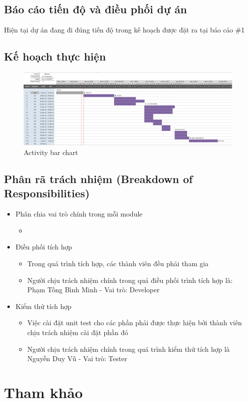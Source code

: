 \documentclass[a4paper, 12pt]{article}
\begin{document}
\subsection{Báo cáo tiến độ và điều phối dự án}

Hiện tại dự án đang đi đúng tiến độ trong kế hoạch được đặt ra tại báo cáo \#1

\subsection{Kế hoạch thực hiện}

\begin{figure}[H]
	\begin{center}
		\includegraphics[scale=0.35, angle=90]{image/gantt.png}
		\caption{Activity bar chart}
	\end{center}
\end{figure}

\subsection{Phân rã trách nhiệm (Breakdown of Responsibilities)}

\begin{itemize}
	\item Phân chia vai trò chính trong mỗi module
	\begin{itemize}
		\item 
	\end{itemize}

	\item Điều phối tích hợp
	\begin{itemize}
		\item Trong quá trình tích hợp, các thành viên đều phải tham gia
		\item Người chịu trách nhiệm chính trong quá điều phối trình tích hợp là: Phạm Tống Bình Minh - Vai trò: Developer
	\end{itemize}

	\item Kiểm thử tích hợp
	\begin{itemize}
		\item Việc cài đặt unit test cho các phần phải được thực hiện bởi thành viên chịu trách nhiệm cài đặt phần đó
		\item Người chịu trách nhiệm chính trong quá trình kiểm thử tích hợp là Nguyễn Duy Vũ - Vai trò: Tester
	\end{itemize}
\end{itemize}

\clearpage

\section{Tham khảo}
\clearpage
	
\end{document}
